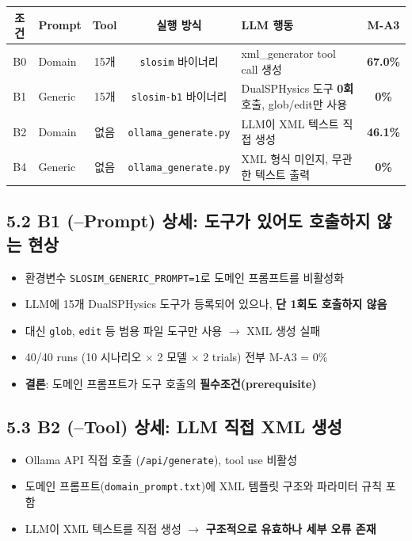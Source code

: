 \documentclass[10pt,a4paper]{article}
\begin{document}
\begin{center}
\small
\begin{tabular}{clccp{5cm}c}
\toprule
\textbf{조건} & \textbf{Prompt} & \textbf{Tool} & \textbf{실행 방식} & \textbf{LLM 행동} & \textbf{M-A3} \\
\midrule
B0 & Domain & 15개 & \texttt{slosim} 바이너리 & xml\_generator tool call 생성 & \textbf{67.0\%} \\
B1 & Generic & 15개 & \texttt{slosim-b1} 바이너리 & DualSPHysics 도구 \textbf{0회} 호출, glob/edit만 사용 & \textbf{0\%} \\
B2 & Domain & 없음 & \texttt{ollama\_generate.py} & LLM이 XML 텍스트 직접 생성 & \textbf{46.1\%} \\
B4 & Generic & 없음 & \texttt{ollama\_generate.py} & XML 형식 미인지, 무관한 텍스트 출력 & \textbf{0\%} \\
\bottomrule
\end{tabular}
\end{center}

\subsection{5.2 B1 (--Prompt) 상세: 도구가 있어도 호출하지 않는 현상}

\begin{itemize}[nosep]
\item 환경변수 \texttt{SLOSIM\_GENERIC\_PROMPT=1}로 도메인 프롬프트를 비활성화
\item LLM에 15개 DualSPHysics 도구가 등록되어 있으나, \textbf{단 1회도 호출하지 않음}
\item 대신 \texttt{glob}, \texttt{edit} 등 범용 파일 도구만 사용 $\rightarrow$ XML 생성 실패
\item 40/40 runs (10 시나리오 $\times$ 2 모델 $\times$ 2 trials) 전부 M-A3 = 0\%
\item \textbf{결론}: 도메인 프롬프트가 도구 호출의 \textbf{필수조건(prerequisite)}
\end{itemize}

\subsection{5.3 B2 (--Tool) 상세: LLM 직접 XML 생성}

\begin{itemize}[nosep]
\item Ollama API 직접 호출 (\texttt{/api/generate}), tool use 비활성
\item 도메인 프롬프트(\texttt{domain\_prompt.txt})에 XML 템플릿 구조와 파라미터 규칙 포함
\item LLM이 XML 텍스트를 직접 생성 $\rightarrow$ \textbf{구조적으로 유효하나 세부 오류 존재}
\end{itemize}
\end{document}
